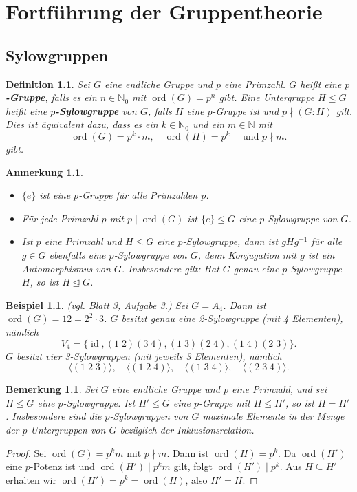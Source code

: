 \documentclass[a4paper, twoside, 11pt, ngerman]{report}
\newcommand{\NN}{\mathds N}
\DeclareMathOperator{\ident}{id}
\DeclareMathOperator{\ord}{ord}
\theoremstyle{definistyle}
\newtheorem{defini}[satz]{Definition}
\newtheorem{bem}[satz]{Bemerkung}
\newtheorem{anm}[satz]{Anmerkung}
\newtheorem{bsp}[satz]{Beispiel}
\theoremstyle{remark}
\newcommand{\defn}[1]{\textit{\bfseries #1}}
\begin{document}
\chapter{Fortführung der Gruppentheorie}
\setcounter{section}{14}
\section{Sylowgruppen}

\begin{defini}\label{def:p_sylowgruppe}
Sei $G$ eine endliche Gruppe und $p$ eine Primzahl. $G$ heißt eine \defn{$p$-Gruppe}, falls es ein $n \in \NN_0$ mit $\ord(G) = p^n$ gibt. Eine Untergruppe $H \leq G$ heißt eine \defn{$p$-Sylowgruppe} von $G$, falls $H$ eine $p$-Gruppe ist und $p \nmid (G : H)$ gilt. Dies ist äquivalent dazu, dass es ein $k \in \NN_0$ und ein $m \in \NN$ mit 
\[
\ord(G) = p^k \cdot m, \quad \ord(H) = p^k \quad \text{ und } p \nmid m.
\]
gibt.
\end{defini}

\begin{anm}\label{anm:p_sylowgruppe}
\begin{itemize}
    \item $\{e\}$ ist eine $p$-Gruppe für alle Primzahlen $p$.
    \item Für jede Primzahl $p$ mit $p \mid \ord(G)$ ist $\{e\}\leq G$ eine $p$-Sylowgruppe von $G$.
    \item Ist $p$ eine Primzahl und $H\leq G$ eine $p$-Sylowgruppe, dann ist $g H g^{-1}$ für alle $g\in G$ ebenfalls eine $p$-Sylowgruppe von $G$, denn Konjugation mit $g$ ist ein Automorphismus von $G$. Insbesondere gilt: Hat $G$ genau eine $p$-Sylowgruppe $H$, so ist $H \trianglelefteq G$.
\end{itemize}
\end{anm}

\begin{bsp}\label{bsp:sylowgruppen_a4}
(vgl. Blatt 3, Aufgabe 3.) Sei $G = A_4$. Dann ist $\ord(G) = 12 = 2^2 \cdot 3$. 
$G$ besitzt genau eine 2-Sylowgruppe (mit 4 Elementen), nämlich
\[
V_4 = \{\ident, (1 \; 2)(3 \; 4), (1 \; 3)(2 \; 4), (1 \; 4)(2 \; 3)\}.
\]
$G$ besitzt vier 3-Sylowgruppen (mit jeweils 3 Elementen), nämlich
\[
\langle (1 \; 2 \; 3) \rangle, \quad \langle (1 \; 2 \; 4) \rangle, \quad \langle (1 \; 3 \; 4) \rangle, \quad \langle (2 \; 3 \; 4) \rangle.
\]
\end{bsp}

\begin{bem}\label{bem:p-sylowgruppen_max}
Sei $G$ eine endliche Gruppe und $p$ eine Primzahl, und sei $H\leq G$ eine $p$-Sylowgruppe. Ist $H'\leq G$
eine $p$-Gruppe mit $H\leq H'$, so ist $H=H'$. Insbesondere sind die $p$-Sylowgruppen von $G$ maximale Elemente
in der Menge der $p$-Untergruppen von $G$ bezüglich der Inklusionsrelation.
\end{bem}
\begin{proof}
Sei $\ord(G) = p^k m$ mit $p \nmid m$. Dann ist $\ord(H) = p^k$.
Da $\ord(H')$ eine $p$-Potenz ist und $\ord(H') \mid p^k m$ gilt, folgt $\ord(H') \mid p^k$.
Aus $H\subseteq H'$ erhalten wir $\ord(H') = p^k= \ord(H)$, also $H' = H$.
\end{proof}
\end{document}
